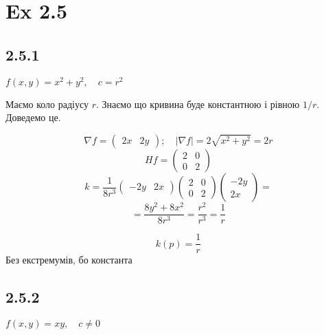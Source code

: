 \documentclass[10pt, a4paper]{article} %
\begin{document}



\newpage
\section*{Ex 2.5}
\subsection*{2.5.1}
\begin{mdframed}
    $f(x,y) = x^2+y^2, \quad c = r^2$
\end{mdframed}
Маємо коло радіусу $r$. Знаємо що кривина буде константною і рівною $1/r$. Доведемо це.

\[\nabla f = \begin{pmatrix} 2x & 2y\end{pmatrix}; \quad |\nabla f| = 2\sqrt{x^2+y^2} = 2r\]
\[Hf = \begin{pmatrix}
    2 & 0\\ 0 & 2
\end{pmatrix}\]
\[k = \frac{1}{8r^3}\begin{pmatrix} -2y & 2x\end{pmatrix}\begin{pmatrix}
    2 & 0\\ 0 & 2
\end{pmatrix}\begin{pmatrix} -2y \\ 2x\end{pmatrix} = \]
\[= \frac{8y^2 + 8x^2}{8r^3} = \frac{r^2}{r^3} = \frac{1}{r}\]

\[k(p) = \frac{1}{r}\]
Без екстремумів, бо константа

\subsection*{2.5.2}
\begin{mdframed}
    $f(x,y) = xy, \quad c \ne 0$
\end{mdframed}
\end{document}
